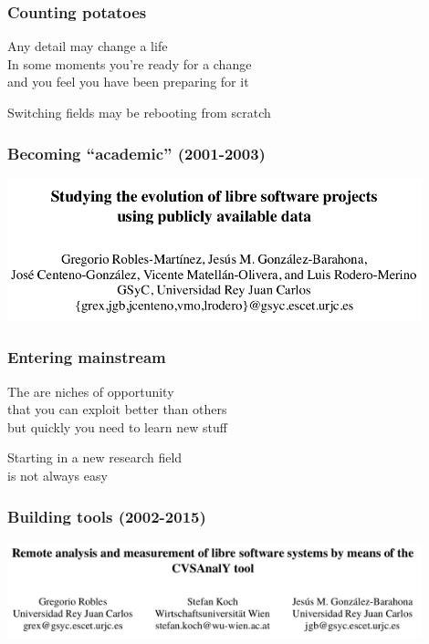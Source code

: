 \documentclass[17pt,aspectratio=169,hyperref=pdfusetitle]{beamer}
\begin{document}
\begin{frame}[fragile]
  \frametitle{Counting potatoes}

  Any detail may change a life \\
  In some moments you're ready for a change \\
  and you feel you have been preparing for it \\
  
  \begin{center}
    Switching fields may be rebooting from scratch
  \end{center}
  
\end{frame}

\begin{frame}[fragile]
  \frametitle{Becoming ``academic'' (2001-2003)}

  \begin{center}
  \includegraphics[width=12cm]{figs/evolution-data}
  \end{center}  
  
\end{frame}

\begin{frame}[fragile]
  \frametitle{Entering mainstream}

  The are niches of opportunity \\
  that you can exploit better than others \\
  but quickly you need to learn new stuff \\
  
  \begin{center}
    Starting in a new research field \\
    is not always easy \\
  \end{center}  
  
\end{frame}


\begin{frame}[fragile]
  \frametitle{Building tools (2002-2015)}

  \begin{center}
  \includegraphics[width=12cm]{figs/cvsanaly}
  \end{center}  
  
\end{frame}
\end{document}
